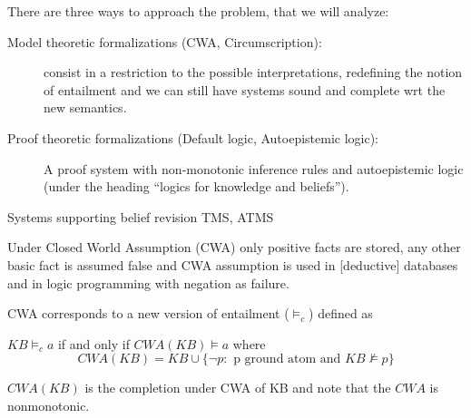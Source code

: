 There are three ways to approach the problem, that we will analyze:
\begin{description}
   \item [Model theoretic formalizations (CWA, Circumscription):]
         consist in a restriction to the possible interpretations, 
         redefining the notion of entailment and we can still have systems
	 sound and complete wrt the new semantics.
   \item [Proof theoretic formalizations (Default logic, Autoepistemic logic):]
      A proof system with non-monotonic inference rules and autoepistemic logic
	(under the heading “logics for knowledge and beliefs”).
   \item [Systems supporting belief revision TMS, ATMS]
\end{description}
Under Closed World Assumption (CWA) only positive facts are stored, any other 
basic fact is assumed false and CWA assumption is used in [deductive] databases
and in logic programming with negation as failure.

CWA corresponds to a new version of entailment ($\models_c$) defined as 
\begin{defi}[CWA]
    $KB \models_c a$ if and only if $CWA(KB) \models a$ where 
    \[ CWA(KB) = KB \cup \{ \neg  p : \text{ p ground atom and } KB \not \models p \} \]
\end{defi}
$CWA(KB)$ is the completion under CWA of KB and note that the $CWA$ is nonmonotonic.

